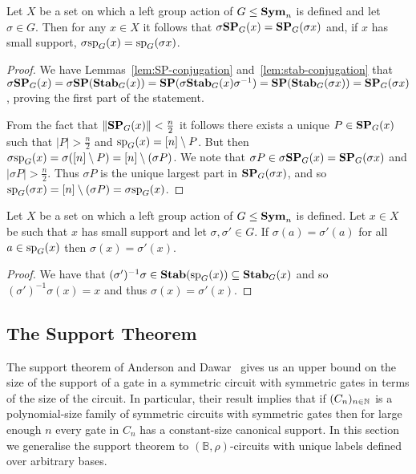 \documentclass[../paper.tex]{subfiles}
\begin{document}
\begin{lem}
  \label{lem:support-mapping}
  Let $X$ be a set on which a left group action of $G \leq \text{\textbf{Sym}}_n$ is defined
  and let $\sigma \in G$. Then for any $x \in X$ it follows that $\sigma \text{\textbf{SP}}_G
  (x) = \text{\textbf{SP}}_G (\sigma x)$ and, if $x$ has small support, $\sigma \text{sp}_G (x) =
  \text{sp}_G (\sigma x)$.
\end{lem}
\begin{proof}
  We have Lemmas~\ref{lem:SP-conjugation} and~\ref{lem:stab-conjugation} that
  $\sigma \text{\textbf{SP}}_G (x) = \sigma \text{\textbf{SP}}(\text{\textbf{Stab}}_G (x)) = \text{\textbf{SP}}(\sigma \text{\textbf{Stab}}_G(x)
  \sigma^{-1}) = \text{\textbf{SP}} (\text{\textbf{Stab}}_G(\sigma x)) = \text{\textbf{SP}}_G (\sigma x)$, proving the first
  part of the statement.

  From the fact that $\| \text{\textbf{SP}}_G(x) \| < \frac{n}{2}$ it follows there exists a
  unique $P \in \text{\textbf{SP}}_G(x)$ such that $\vert P \vert > \frac{n}{2}$ and
  $\text{sp}_G(x) = [n] \setminus P$. But then $\sigma \text{sp}_G (x) = \sigma([n]
  \setminus P) = [n] \setminus (\sigma P)$. We note that $\sigma P \in \sigma
  \text{\textbf{SP}}_G (x) = \text{\textbf{SP}}_G(\sigma x)$ and $\vert \sigma P \vert > \frac{n}{2}$. Thus
  $\sigma P$ is the unique largest part in $\text{\textbf{SP}}_G(\sigma x)$, and so
  $\text{sp}_G(\sigma x) = [n] \setminus (\sigma P) = \sigma \text{sp}_G(x)$.
\end{proof}

\begin{lem}
  Let $X$ be a set on which a left group action of $G \leq \text{\textbf{Sym}}_n$ is defined.
  Let $x \in X$ be such that $x$ has small support and let $\sigma, \sigma' \in
  G$. If $\sigma (a) = \sigma' (a)$ for all $a \in \text{sp}_G(x)$ then $\sigma (x)
  = \sigma'(x)$.
  \label{lem:support-determine-action}
\end{lem}
\begin{proof}
  We have that $(\sigma')^{-1}\sigma \in \text{\textbf{Stab}}(\text{sp}_G(x)) \subseteq
  \text{\textbf{Stab}}_G(x)$ and so $(\sigma')^{-1} \sigma (x) = x$ and thus $\sigma (x) =
  \sigma' (x)$.
\end{proof}

\subsection{The Support Theorem}
The support theorem of Anderson and Dawar~\cite{AndersonD17} gives us an upper
bound on the size of the support of a gate in a symmetric circuit with symmetric
gates in terms of the size of the circuit. In particular, their result implies
that if $(C_n)_{n \in \mathbb{N}}$ is a polynomial-size family of symmetric circuits
with symmetric gates then for large enough $n$ every gate in $C_n$ has a
constant-size canonical support. In this section we generalise the support
theorem to $(\mathbb{B}, \rho)$-circuits with unique labels defined over
arbitrary bases.
\end{document}
